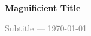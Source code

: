 



\thispagestyle{my_style}
\vspace*{0.5cm}  %
\enlargethispage{-1cm} %
\Huge %
\textbf{Magnificient Title}

\large
\textcolor{gray}{
Subtitle --- \today
}



\setcounter{page}{1}

